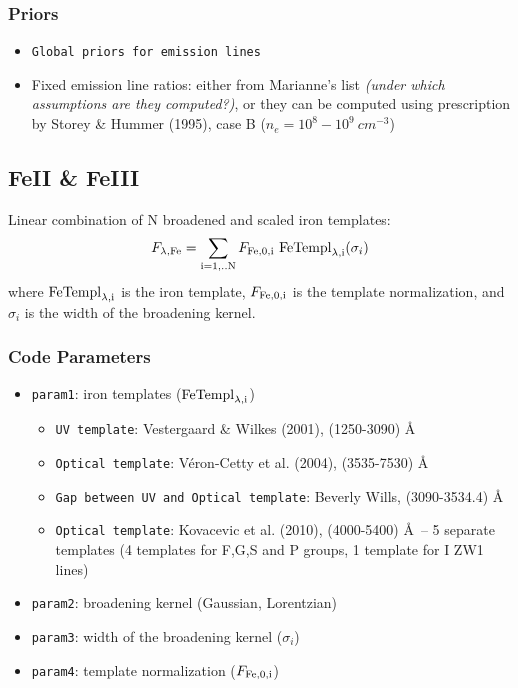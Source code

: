 \documentclass[12pt,letterpaper]{article}
\begin{document}
\subsubsection*{Priors} 
\begin{itemize}
    \item {\tt Global priors for emission lines}
    \item {Fixed emission line ratios}: either from Marianne's list \textit{(under which assumptions are they computed?)}, or they can be computed using prescription 
      by Storey \& Hummer (1995), case B ($n_e=10^8-10^9 \ cm^{-3}$)        
\end{itemize}

\subsection*{FeII \& FeIII}
Linear combination of N broadened and scaled iron templates:
\begin{equation}
F_{\lambda {\rm{,Fe}}} = \sum_{\rm i=1,..N} F_{\rm{Fe,0,i}} \  {\rm FeTempl}_{\rm{\lambda,i}}(\sigma_i) 
\end{equation}		
where ${\rm FeTempl}_{\rm{\lambda,i}}$ is the iron template, $F_{\rm Fe,0,i}$ is the template normalization, 
and $\sigma_i$ is the width of the broadening kernel.

\subsubsection*{Code Parameters}
\begin{itemize}
    \item {\tt param1}: iron templates (${\rm FeTempl}_{\rm{\lambda,i}}$)
    \begin{itemize}
       \item {\tt UV template}: Vestergaard \& Wilkes (2001), (1250-3090) \AA
       \item {\tt Optical template}: V\'{e}ron-Cetty et al. (2004), (3535-7530) \AA
       \item {\tt Gap between UV and Optical template}: Beverly Wills, (3090-3534.4) \AA 
       \item {\tt Optical template}: Kovacevic et al. (2010), (4000-5400) \AA \ -- 5 separate templates (4 templates for F,G,S and P groups, 1 template for 
      I ZW1 lines) 
    \end{itemize}
    \item {\tt param2}: broadening kernel (Gaussian, Lorentzian)
    \item {\tt param3}: width of the broadening kernel ($\sigma_i$)
    \item {\tt param4}: template normalization ($F_{\rm Fe,0,i}$)  
\end{itemize}
\end{document}
